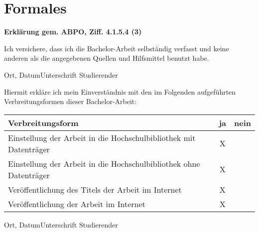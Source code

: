 \pagestyle{empty} %


\chapter*{Formales} %
\label{cha:formales}
\textbf{Erklärung gem. ABPO, Ziff. 4.1.5.4 (3)}

\vspace{20pt}

Ich versichere, dass ich die Bachelor-Arbeit selbständig verfasst und keine anderen als die angegebenen Quellen und Hilfsmittel benutzt habe.

\vspace{20pt}

Ort, Datum\hfill Unterschrift Studierender

\vspace{25pt}

\noindent\makebox[5cm]{\hrulefill} \hfill \makebox[5cm]{\hrulefill}

\vspace{40pt}

\noindent\makebox[\linewidth]{\rule{\textwidth}{1pt}} %

\vspace{40pt}

Hiermit erkläre ich mein Einverständnis mit den im Folgenden aufgeführten Verbreitungsformen dieser Bachelor-Arbeit:

\begin{center}
  \begin{tabular}{ | l | c | c | }
    \hline
    \textbf{Verbreitungsform}                                             & \textbf{ja} & \textbf{nein} \\ \hline
    Einstellung der Arbeit in die Hochschulbibliothek mit Datenträger     & X           &               \\ \hline
    Einstellung der Arbeit in die Hochschulbibliothek ohne Datenträger    & X           &               \\ \hline
	Veröffentlichung des Titels der Arbeit im Internet                    & X           &               \\ \hline
	Veröffentlichung der Arbeit im Internet                               & X           &               \\
    \hline
  \end{tabular}
\end{center}

\vspace{20pt}

Ort, Datum\hfill Unterschrift Studierender

\vspace{25pt}

\noindent\makebox[5cm]{\hrulefill} \hfill \makebox[5cm]{\hrulefill}